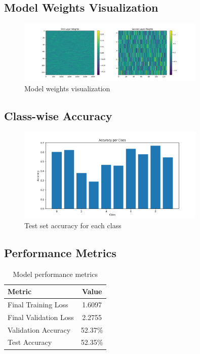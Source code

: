 \documentclass[12pt]{article}
\begin{document}
\subsection{Model Weights Visualization}
\begin{figure}[H]
    \centering
    \includegraphics[width=0.8\textwidth]{results/weights_visualization.png}
    \caption{Model weights visualization}
    \label{fig:weights}
\end{figure}

\subsection{Class-wise Accuracy}
\begin{figure}[H]
    \centering
    \includegraphics[width=0.8\textwidth]{results/class_accuracies.png}
    \caption{Test set accuracy for each class}
    \label{fig:class_acc}
\end{figure}

\subsection{Performance Metrics}
\begin{table}[H]
    \centering
    \begin{tabular}{lc}
        \toprule
        Metric & Value \\
        \midrule
        Final Training Loss & 1.6097 \\
        Final Validation Loss & 2.2755 \\
        Validation Accuracy & 52.37\% \\
        Test Accuracy & 52.35\% \\
        \bottomrule
    \end{tabular}
    \caption{Model performance metrics}
    \label{tab:metrics}
\end{table}
\end{document}
